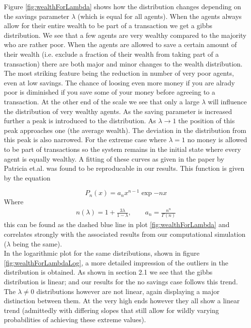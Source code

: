 Figure \ref{fig:wealthForLambda} shows how the distribution changes depending on the savings parameter $\lambda$ (which is equal for all agents). When the agents always allow for their entire wealth to be part of a transaction we get a gibbs distribution. We see that a few agents are very wealthy compared to the majority who are rather poor. When the agents are allowed to save a certain amount of their wealth (i.e. exclude a fraction of their wealth from taking part of a transaction) there are both major and minor changes to the wealth distribution. The most striking feature being the reduction in number of very poor agents, even at low savings. The chance of loosing even more money if you are alrady poor is diminished if you save some of your money before agreeing to a transaction. At the other end of the scale we see that only a large $\lambda$ will influence the distribution of very wealthy agents. As the saving parameter is increased further a peak is introduced to the distribution. As $\lambda\rightarrow 1$ the position of this peak approaches one (the average wealth). The deviation in the distribution from this peak is also narrowed. For the extreme case where $\lambda=1$ no money is allowed to be part of transactions so the system remains in the initial state where every agent is equally wealthy. A fitting of these curves as given in the paper by Patricia et.al. \cite{patriarca} was found to be reproducable in our results. This function is given by the equation 

\begin{equation}
    P_n(x)=a_nx^{n-1}\exp{-nx}
    \label{eq:patFit}
\end{equation}
Where
\begin{align*}
    n(\lambda)=1+\frac{3\lambda}{1-\lambda},\qquad a_n=\frac{n^n}{\Gamma(n)}
\end{align*}
 this can be found as the dashed blue line in plot \ref{fig:wealthForLambda} and correlates strongly with the associated results from our computational simulation ($\lambda$ being the same).\\


In the logarithmic plot for the same distributions, shown in figure \ref{fig:wealthForLambdaLog}, a more detailed impression of the outliers in the distribution is obtained. As shown in section 2.1 we see that the gibbs distribution is linear; and our results for the no savings case follows this trend. The $\lambda \neq 0$ distributions however are not linear, again displaying a major distinction between them. At the very high ends however they all show a linear trend (admittedly with differing slopes that still allow for wildly varying probabilities of achieving these extreme values).


